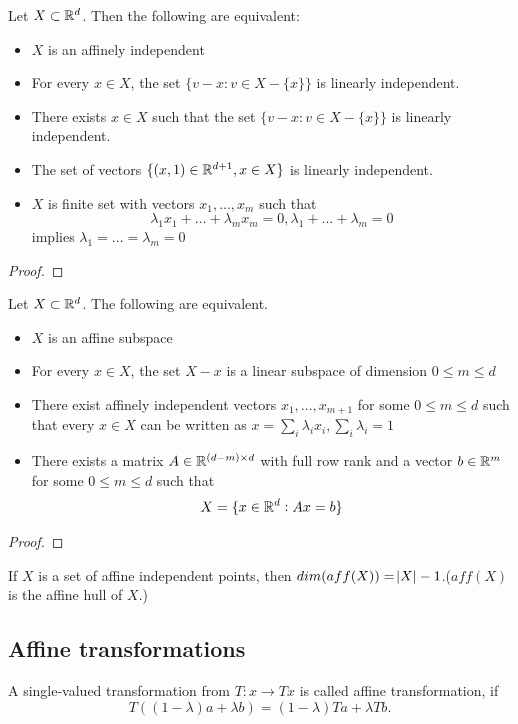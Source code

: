 \begin{refsection}
\begin{theorem}
	Let $X\subset \mathbb{R}^d$. Then the following are equivalent:
	\begin{itemize}
		\item $X$ is an affinely independent
		\item For every $x\in X$, the set $\{v-x:v\in X-\{x\}\}$ is linearly independent. 
		\item There exists $x\in X$ such that the set $\{v-x:v\in X-\{x\}\}$ is linearly independent.
		\item The set of vectors $\{(x,1)\in \mathbb{R}^{d+1},x\in X \}$ is linearly independent.  
		\item $X$ is finite set with vectors $x_1,...,x_m$ such that $$\lambda_1 x_1 + ... + \lambda_m x_m = 0, \lambda_1+...+\lambda_m = 0$$ implies
		$\lambda_1 =... = \lambda_m = 0$
	\end{itemize}
\end{theorem}
\begin{proof}
\end{proof}
\begin{theorem}
	Let $X\subset \mathbb{R}^d$. The following are equivalent.
	\begin{itemize}
		\item $X$ is an affine subspace
		\item For every $x\in X$, the set $X-x$ is a linear subspace of dimension $0\leq m\leq d$
		\item There exist affinely independent vectors $x_1,...,x_{m+1}$ for some $0 \leq m \leq d$ such that every $x\in X$ can be written as $x = \sum_i\lambda_ix_i,\sum_i\lambda_i = 1$
		\item There exists a matrix $A\in \mathbb{R}^{(d-m)\times d}$ with full row rank and a vector $b\in \mathbb{R}^m$ for some $0\leq m\leq d$ such that $$X=\{x\in \mathbb{R}^d: Ax = b\}$$
	\end{itemize}
\end{theorem}
\begin{proof}
	
\end{proof}


\begin{corollary}
	If $X$ is a set of affine independent points, then $dim(aff(X)) = \abs{X}-1$.($aff(X)$ is the affine hull of $X$.)
\end{corollary}





\subsection{Affine transformations}
\begin{definition}\cite[7]{rockafellar1997convex}
A single-valued transformation from $T:x\to Tx$ is called affine transformation, if
$$T((1-\lambda)a + \lambda b) = (1-\lambda)Ta + \lambda Tb.$$
\end{definition}



\end{refsection}
